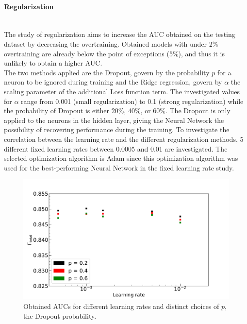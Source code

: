 \paragraph {Regularization} \mbox{} \\

The study of regularization aims to increase the AUC obtained on the testing dataset by decreasing the overtraining. Obtained models with under 2\% overtraining are already below the point of exceptions (5\%), and thus it is unlikely to obtain a higher AUC. \\
The two methods applied are the Dropout, govern by the probability $p$ for a neuron to be ignored during training and the Ridge regression, govern by $\alpha$ the scaling parameter of the additional Loss function term. The investigated values for $\alpha$ range from 0.001 (small regularization) to 0.1 (strong regularization) while the probability of Dropout is either 20\%, 40\%, or 60\%. The Dropout is only applied to the neurons in the hidden layer, giving the Neural Network the possibility of recovering performance during the training. To investigate the correlation between the learning rate and the different regularization methods, 5 different fixed learning rates between 0.0005 and 0.01 are investigated. The selected optimization algorithm is Adam since this optimization algorithm was used for the best-performing Neural Network in the fixed learning rate study. \\

\begin{figure}[H]
\centering
\includegraphics[width=\linewidth]{figs/FNN/Drop_Fixed}
\caption{Obtained AUCs for different learning rates and distinct choices of $p$, the Dropout probability.}
\label{fig:ReguDrop}
\end{figure}


